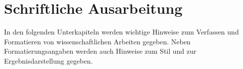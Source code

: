 \documentclass[utf8, a4paper, 11pt, parskip, pointlessnumbers]{scrreprt}
\begin{document}
\newpage
\renewcommand{\listtablename}{\Large\normalfont\bfseries Tabellenverzeichnis}
\setlength\cftbeforelottitleskip{-20pt} 
\setlength\cftafterlottitleskip{0pt}
\renewcommand{\cftmarklot}{\small\normalfont}
\listoftables 
{}

\newpage
\renewcommand{\nomname}{Symbolverzeichnis}
\printnomenclature
{}

\cleardoublepage	
{}
\newpage

\newpage

\newpage

\newpage

\newpage
\chapter{Schriftliche Ausarbeitung} \label{chap:wissA}
In den folgenden Unterkapiteln werden wichtige Hinweise zum Verfassen und Formatieren von wissenschaftlichen Arbeiten gegeben. Neben Formatierungsangaben werden auch Hinweise zum Stil und zur Ergebnisdarstellung gegeben. 
\end{document}
